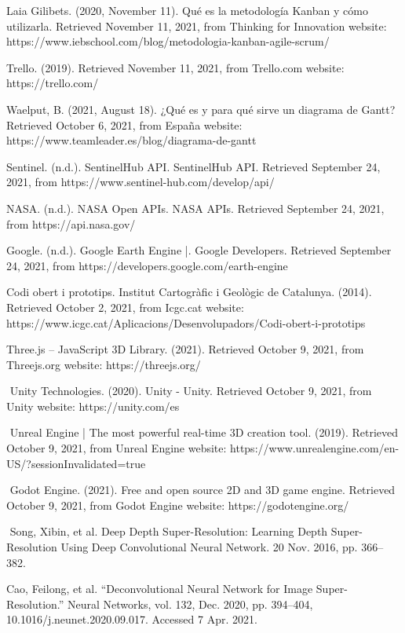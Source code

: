 ﻿\documentclass[10pt,a4paper,twocolumn,twoside]{article}
\begin{document}
\begin{thebibliography}{15}

Laia Gilibets. (2020, November 11). Qué es la metodología Kanban y cómo utilizarla. Retrieved November 11, 2021, from Thinking for Innovation website: https://www.iebschool.com/blog/metodologia-kanban-agile-scrum/

Trello. (2019). Retrieved November 11, 2021, from Trello.com website: https://trello.com/

Waelput, B. (2021, August 18). ¿Qué es y para qué sirve un diagrama de Gantt? Retrieved October 6, 2021, from España website: https://www.teamleader.es/blog/diagrama-de-gantt

Sentinel. (n.d.). SentinelHub API. SentinelHub API. Retrieved September 24, 2021, from https://www.sentinel-hub.com/develop/api/

NASA. (n.d.). NASA Open APIs. NASA APIs. Retrieved September 24, 2021, from https://api.nasa.gov/

Google. (n.d.). Google Earth Engine |. Google Developers. Retrieved September 24, 2021, from https://developers.google.com/earth-engine

Codi obert i prototips. Institut Cartogràfic i Geològic de Catalunya. (2014). Retrieved October 2, 2021, from Icgc.cat website: https://www.icgc.cat/Aplicacions/Desenvolupadors/Codi-obert-i-prototips


Three.js – JavaScript 3D Library. (2021). Retrieved October 9, 2021, from Threejs.org website: https://threejs.org/

‌
Unity Technologies. (2020). Unity - Unity. Retrieved October 9, 2021, from Unity website: https://unity.com/es

‌
Unreal Engine | The most powerful real-time 3D creation tool. (2019). Retrieved October 9, 2021, from Unreal Engine website: https://www.unrealengine.com/en-US/?sessionInvalidated=true

‌
Godot Engine. (2021). Free and open source 2D and 3D game engine. Retrieved October 9, 2021, from Godot Engine website: https://godotengine.org/

‌
Song, Xibin, et al. Deep Depth Super-Resolution: Learning Depth Super-Resolution Using Deep Convolutional Neural Network. 20 Nov. 2016, pp. 366–382.

Cao, Feilong, et al. “Deconvolutional Neural Network for Image Super-Resolution.” Neural Networks, vol. 132, Dec. 2020, pp. 394–404, 10.1016/j.neunet.2020.09.017. Accessed 7 Apr. 2021.


\end{thebibliography}
\end{document}
